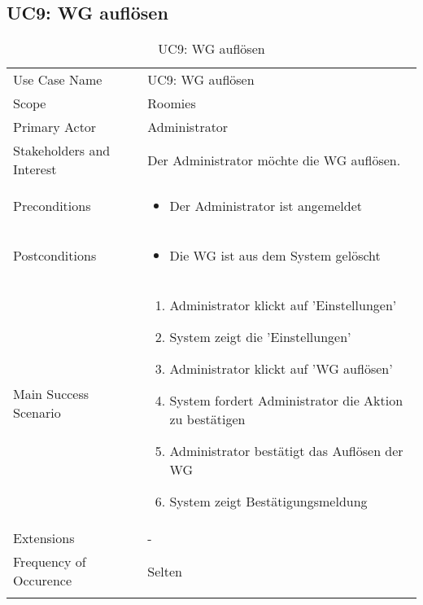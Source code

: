 \subsection{UC9: WG auflösen}
\begin{table}[H]
	\tablestyle
	\tablealtcolored
	\begin{tabularx}{\textwidth}{lX}
		\tablebody
			Use Case Name &
			UC9: WG auflösen
			\tabularnewline
			Scope &
			Roomies
			\tabularnewline
			Primary Actor &
			Administrator
			\tabularnewline
			Stakeholders and Interest &
			Der Administrator möchte die WG auflösen.
			\tabularnewline
			Preconditions &
			\begin{itemize}
				\item Der Administrator ist angemeldet
			\end{itemize}
			\tabularnewline
			Postconditions &
			\begin{itemize}
				\item Die WG ist aus dem System gelöscht
			\end{itemize}
			\tabularnewline
			Main Success Scenario &
			\begin{enumerate}
				\item Administrator klickt auf 'Einstellungen'
				\item System zeigt die 'Einstellungen'
				\item Administrator klickt auf 'WG auflösen'
				\item System fordert Administrator die Aktion zu bestätigen
				\item Administrator bestätigt das Auflösen der WG
				\item System zeigt Bestätigungsmeldung
			\end{enumerate}
			\tabularnewline
			Extensions &
			-
			\tabularnewline
			Frequency of Occurence &
			Selten
			\tabularnewline
		\tableend
	\end{tabularx}
	\caption{UC9: WG auflösen}
\end{table}


